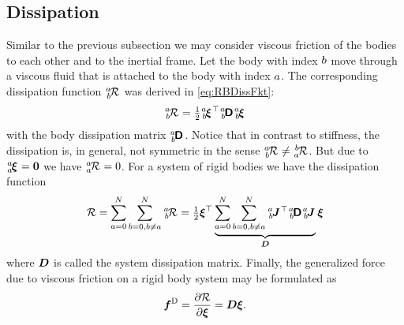 \subsection{Dissipation}
Similar to the previous subsection we may consider viscous friction of the bodies to each other and to the inertial frame.
Let the body with index $\BidxII$ move through a viscous fluid that is attached to the body with index $\BidxI$.
The corresponding dissipation function $\bodyDissFkt{\BidxI}{\BidxII}$ was derived in \eqref{eq:RBDissFkt}:
\begin{align}
 \bodyDissFkt{\BidxI}{\BidxII} = \tfrac{1}{2} \bodyVel{\BidxI}{\BidxII}^\top \bodyDissMat{\BidxI}{\BidxII} \bodyVel{\BidxI}{\BidxII}
\end{align}
with the body dissipation matrix $\bodyDissMat{\BidxI}{\BidxII}$.
Notice that in contrast to stiffness, the dissipation is, in general, not symmetric in the sense $\bodyDissFkt{\BidxI}{\BidxII} \neq \bodyDissFkt{\BidxII}{\BidxI}$.
But due to $\bodyVel{\BidxI}{\BidxI} = \tuple{0}$ we have $\bodyDissFkt{\BidxI}{\BidxI}=0$.
For a system of rigid bodies we have the dissipation function
\begin{align}
 \dissFkt = \sum_{\BidxI=0}^{\numRigidBodies} \sum_{\BidxII=0, \BidxII\neq\BidxI}^{\numRigidBodies} \bodyDissFkt{\BidxI}{\BidxII}
 = \tfrac{1}{2} \sysVel^\top \underbrace{\sum_{\BidxI=0}^{\numRigidBodies} \sum_{\BidxII=0, \BidxII\neq\BidxI}^{\numRigidBodies} \bodyJac{\BidxI}{\BidxII}^\top \bodyDissMat{\BidxI}{\BidxII} \bodyJac{\BidxI}{\BidxII}}_{\sysDissMat} \sysVel
\end{align}
where $\sysDissMat$ is called the system dissipation matrix.
Finally, the generalized force due to viscous friction on a rigid body system may be formulated as
\begin{align}
 \genForceDiss = \pdiff[\dissFkt]{\sysVel} = \sysDissMat \sysVel
 .
\end{align}

